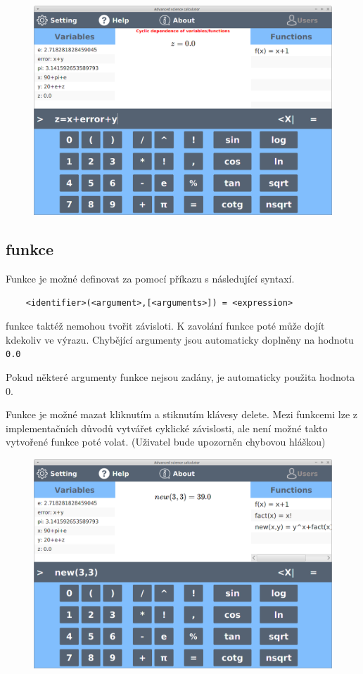 \documentclass[11pt, a4paper, titlepage]{article}
\begin{document}
	\begin{figure}[h!]
	    \centering
	    \includegraphics[scale=0.3]{./assets/cycle.png}
	\end{figure}

	\newpage

	\subsection{funkce}
	Funkce je možné definovat za pomocí příkazu s následující syntaxí.

	\begin{lstlisting}
	<identifier>(<argument>,[<arguments>]) = <expression>
	\end{lstlisting}

	funkce taktéž nemohou tvořit závisloti. K zavolání funkce poté může dojít kdekoliv ve výrazu. Chybějící
	argumenty jsou automaticky doplněny na hodnotu \texttt{0.0}

	Pokud některé argumenty funkce nejsou zadány, je automaticky použita hodnota 0.

	Funkce je možné mazat kliknutím a stiknutím klávesy delete. Mezi funkcemi lze z implementačních důvodů vytvářet
	cyklické závislosti, ale není možné takto vytvořené funkce poté volat. (Uživatel bude upozorněn chybovou 
	hláškou)
	
	\begin{figure}[h!]
	    \centering
	    \includegraphics[scale=0.3]{./assets/func.png}
	\end{figure}
\end{document}
